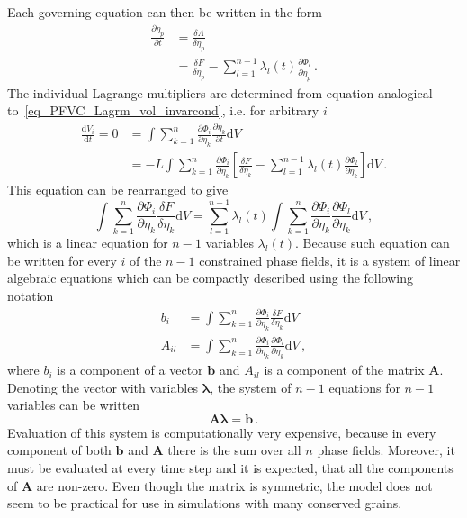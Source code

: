 Each governing equation can then be written in the form
\begin{align}
	\frac{\partial \eta_p}{\partial t} &= \frac{\delta \Lambda}{\delta \eta_p} \\
	&= \frac{\delta F}{\delta \eta_p} - \sum_{l=1}^{n-1}\lambda_l(t)\frac{\partial \Phi_l}{\partial \eta_p}\,.
\end{align}
The individual Lagrange multipliers are determined from equation analogical to~\eqref{eq_PFVC_Lagrm_vol_invarcond}, i.e. for arbitrary $i$ 
\begin{align}
	\frac{\mathrm{d} V_i}{\mathrm{d} t} = 0 &= \int \sum_{k=1}^n\frac{\partial \Phi_i}{\partial \eta_k}\frac{\partial \eta_k}{\partial t} \mathrm{d}V \\
	&= -L\int \sum_{k=1}^n\frac{\partial \Phi_i}{\partial \eta_k}\left[ \frac{\delta F}{\delta \eta_k} - \sum_{l=1}^{n-1}\lambda_l(t)\frac{\partial \Phi_l}{\partial \eta_k} \right] \mathrm{d}V \,.
\end{align}
This equation can be rearranged to give
\begin{equation}
	\int \sum_{k=1}^n\frac{\partial \Phi_i}{\partial \eta_k} \frac{\delta F}{\delta \eta_k} \mathrm{d}V = \sum_{l=1}^{n-1}\lambda_l(t) \int \sum_{k=1}^n\frac{\partial \Phi_i}{\partial \eta_k}\frac{\partial \Phi_l}{\partial \eta_k}  \mathrm{d}V \,,
\end{equation}
which is a linear equation for $n-1$ variables $\lambda_l(t)$. Because such equation can be written for every $i$ of the $n-1$ constrained phase fields, it is a system of linear algebraic equations which can be compactly described using the following notation
\begin{align}
	b_{i} &= \int \sum_{k=1}^n\frac{\partial \Phi_i}{\partial \eta_k} \frac{\delta F}{\delta \eta_k} \mathrm{d}V \\
	A_{il} &= \int \sum_{k=1}^n\frac{\partial \Phi_i}{\partial \eta_k}\frac{\partial \Phi_l}{\partial \eta_k}  \mathrm{d}V \,,
\end{align}
where $b_{i}$ is a component of a vector $\bm{b}$ and $A_{il}$ is a component of the matrix $\bm{A}$. Denoting the vector with variables $\bm{\lambda}$, the system of $n-1$ equations for $n-1$ variables can be written
\begin{equation}
	\bm{A}\bm{\lambda} = \bm{b} \,.
\end{equation}
Evaluation of this system is computationally very expensive, because in every component of both $\bm{b}$ and $\bm{A}$ there is the sum over all $n$ phase fields. Moreover, it must be evaluated at every time step and it is expected, that all the components of $\bm{A}$ are non-zero. Even though the matrix is symmetric, the model does not seem to be practical for use in simulations with many conserved grains.






\cleardoublepage

